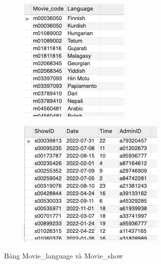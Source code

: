 \begin{figure}[H]
\begin{subfigure}{.5\textwidth}
  \centering
  \includegraphics[width=.8\linewidth]{images/LANGUAGE.png}
\end{subfigure}%
\begin{subfigure}{.5\textwidth}
  \centering
  \includegraphics[width=.8\linewidth]{images/MOVIE_SHOW.png}
\end{subfigure}
\caption{Bảng Movie\_language và Movie\_show}
\end{figure}

